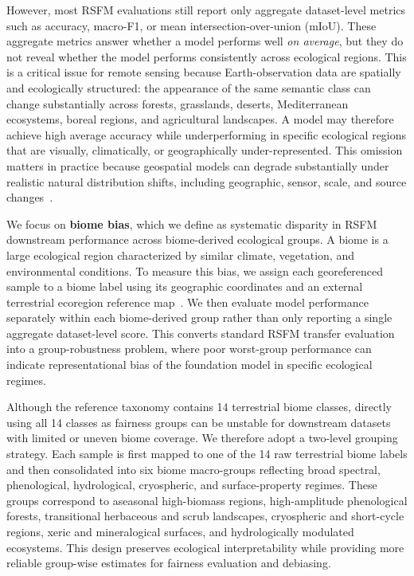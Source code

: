 \documentclass[10pt,twocolumn,letterpaper]{article}
\begin{document}
However, most RSFM evaluations still report only aggregate dataset-level metrics such as accuracy, macro-F1, or mean intersection-over-union (mIoU). These aggregate metrics answer whether a model performs well \emph{on average}, but they do not reveal whether the model performs consistently across ecological regions. This is a critical issue for remote sensing because Earth-observation data are spatially and ecologically structured: the appearance of the same semantic class can change substantially across forests, grasslands, deserts, Mediterranean ecosystems, boreal regions, and agricultural landscapes. A model may therefore achieve high average accuracy while underperforming in specific ecological regions that are visually, climatically, or geographically under-represented. This omission matters in practice because geospatial models can degrade substantially under realistic natural distribution shifts, including geographic, sensor, scale, and source changes~\cite{rolf2023evaluation,earthshift2026}.


We focus on \textbf{biome bias}, which we define as systematic disparity in RSFM downstream performance across biome-derived ecological groups. A biome is a large ecological region characterized by similar climate, vegetation, and environmental conditions. To measure this bias, we assign each georeferenced sample to a biome label using its geographic coordinates and an external terrestrial ecoregion reference map~\cite{terrestrialecoregions,ecoregions2017}. We then evaluate model performance separately within each biome-derived group rather than only reporting a single aggregate dataset-level score. This converts standard RSFM transfer evaluation into a group-robustness problem, where poor worst-group performance can indicate representational bias of the foundation model in specific ecological regimes.

Although the reference taxonomy contains 14 terrestrial biome classes, directly using all 14 classes as fairness groups can be unstable for downstream datasets with limited or uneven biome coverage. We therefore adopt a two-level grouping strategy. Each sample is first mapped to one of the 14 raw terrestrial biome labels and then consolidated into six biome macro-groups reflecting broad spectral, phenological, hydrological, cryospheric, and surface-property regimes. These groups correspond to aseasonal high-biomass regions, high-amplitude phenological forests, transitional herbaceous and scrub landscapes, cryospheric and short-cycle regions, xeric and mineralogical surfaces, and hydrologically modulated ecosystems. This design preserves ecological interpretability while providing more reliable group-wise estimates for fairness evaluation and debiasing.
\end{document}
